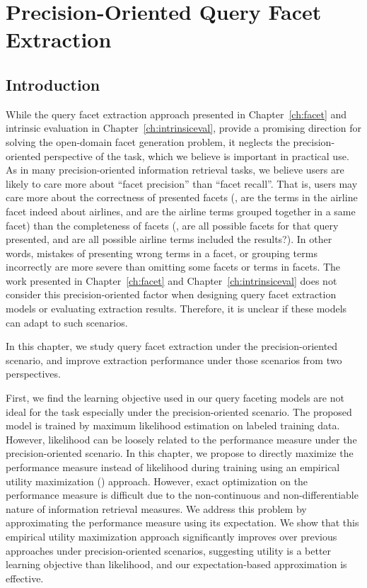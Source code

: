 \chapter{Precision-Oriented Query Facet Extraction}
\label{ch:precision}
\section{Introduction}
\label{sec:precision-intro}
While the query facet extraction approach presented in Chapter~\ref{ch:facet} and intrinsic evaluation in Chapter~\ref{ch:intrinsiceval}, provide a promising direction for solving the open-domain facet generation problem, it neglects the precision-oriented perspective of the task, which we believe is important in practical use. As in many precision-oriented information retrieval tasks, we believe users are likely to care more about ``facet precision'' than ``facet recall''. That is, users may care more about the correctness of presented facets (\eg, are the terms in the airline facet indeed about airlines, and are the airline terms grouped together in a same facet) than the completeness of facets (\eg, are all possible facets for that query presented, and are all possible airline terms included the results?). In other words, mistakes of presenting wrong terms in a facet, or grouping terms incorrectly are more severe than omitting some facets or terms in facets. The work presented in Chapter~\ref{ch:facet} and Chapter~\ref{ch:intrinsiceval} does not consider 
this precision-oriented factor when designing query facet extraction models or evaluating 
extraction results. Therefore, it is unclear if these models can adapt to such scenarios.

In this chapter, we study query facet extraction under the precision-oriented scenario, and improve extraction performance under those scenarios from two perspectives.

First, we find the learning objective used in our query faceting models are not ideal for the task especially under the precision-oriented scenario. The proposed model is trained by maximum likelihood estimation on labeled training data. However, likelihood can be loosely related to the performance measure under the precision-oriented scenario. In this chapter, we propose to directly maximize the performance measure \PRF instead of likelihood during training using an empirical utility maximization (\EUM) approach. However, exact optimization on the performance measure is difficult due to the non-continuous and non-differentiable nature of information retrieval measures. We address this problem by approximating the performance measure using its expectation. We show that this empirical utility maximization approach significantly improves over previous approaches under precision-oriented scenarios, suggesting utility is a better learning objective than likelihood, and our expectation-based 
approximation is effective.  


